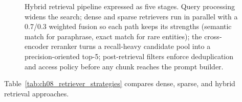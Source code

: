 \begin{figure}[t]
\begin{llmfigbox}
\end{llmfigbox}
\caption{Hybrid retrieval pipeline expressed as five stages. Query processing widens the search; dense and sparse retrievers run in parallel with a 0.7/0.3 weighted fusion so each path keeps its strengths (semantic match for paraphrase, exact match for rare entities); the cross-encoder reranker turns a recall-heavy candidate pool into a precision-oriented top-5; post-retrieval filters enforce deduplication and access policy before any chunk reaches the prompt builder.}
\label{fig:ch08_retrieval_callout}
\end{figure}

Table~\ref{tab:ch08_retriever_strategies} compares dense, sparse, and hybrid retrieval approaches.

